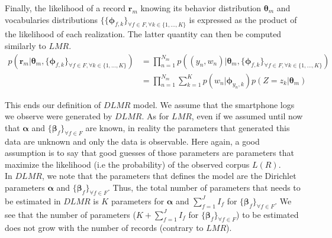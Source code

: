 Finally, the likelihood of a record $\mathbf{r}_{m}$ knowing its behavior distribution $\boldsymbol{\theta}_{m}$ and vocabularies distributions $\{\{\boldsymbol{\phi }_{f,k}\}_{\forall f \in F, \forall k\in\{1,...,K\}}$ is expressed as the product of the likelihood of each realization. The latter quantity can then be computed similarly to $LMR$.
\begin{equation}
\begin{aligned} 
p(\mathbf{r}_{m}|\boldsymbol{\theta }_{m}, \{\boldsymbol{\phi}_{f,k}\}_{\forall f \in F, \forall k\in\{1,...,K\}})&=\prod_{n=1}^{N_{m}}p((y_{n},w_{n})|\boldsymbol{\theta }_{m}, \{\boldsymbol{\phi}_{f,k}\}_{\forall f \in F, \forall k\in\{1,...,K\}})\\
&=\prod_{n=1}^{N_{m}}\sum_{k=1}^{K}p(w_{n}|\boldsymbol{\phi}_{y_{n},k})p(Z=z_{k}|\boldsymbol{\theta }_{m})
\end{aligned} 
\end{equation}
 
This ends our definition of $DLMR$ model. We assume that the smartphone logs we observe were generated by $DLMR$. As for $LMR$, even if we assumed until now that $\boldsymbol{\alpha}$ and $\{\boldsymbol{\beta }_{f}\}_{\forall f\in F}$ are known, in reality the parameters that generated this data are unknown and only the data is observable. Here again, a good assumption is to say that good guesses of those parameters are parameters that maximize the likelihood (i.e the probability) of the observed corpus $L(R)$.
\\In $DLMR$, we note that the parameters that defines the model are the Dirichlet parameters $\boldsymbol{\alpha}$ and $\{\boldsymbol{\beta }_{f}\}_{\forall f\in F}$. Thus, the total number of parameters that needs to be estimated in $DLMR$ is $K$ parameters for $\boldsymbol{\alpha}$ and $\sum_{f=1}^{J}I_{f}$ for $\{\boldsymbol{\beta }_{f}\}_{\forall f\in F}$. We see that the number of parameters ($K+\sum_{f=1}^{J}I_{f}$ for $\{\boldsymbol{\beta }_{f}\}_{\forall f\in F}$) to be estimated does not grow with the number of records (contrary to $LMR$). \par

